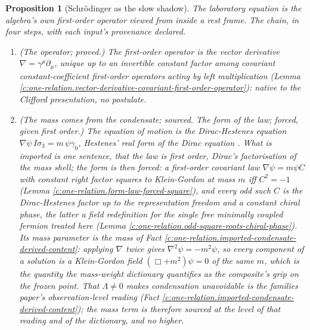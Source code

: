 \documentclass[11pt]{article}
\newtheorem{proposition}[theorem]{Proposition}
\theoremstyle{definition}
\theoremstyle{plain}
\begin{document}
\begin{proposition}[Schrödinger as the slow shadow]\label{c:one-relation.schr-odinger-slow-shadow}
The laboratory equation is the algebra's own first-order operator viewed from inside a rest frame. The chain, in four steps, with each input's provenance declared.
\begin{enumerate}
\item \emph{(The operator; proved.)} The first-order operator is the vector derivative $\nabla = \gamma^{\mu}\partial_{\mu}$, unique up to an invertible constant factor among covariant constant-coefficient first-order operators acting by left multiplication (Lemma \ref{c:one-relation.vector-derivative-covariant-first-order-operator}): native to the Clifford presentation, no postulate.
\item \emph{(The mass comes from the condensate; sourced. The form of the law; forced, given first order.)} The equation of motion is the Dirac-Hestenes equation $\nabla\psi\, I\sigma_{3} = m\,\psi\gamma_{0}$, Hestenes' real form of the Dirac equation \cite{Hestenes1967, Hestenes1975}. What is imported is one sentence, that the law is first order, Dirac's factorisation of the mass shell; the form is then forced: a first-order covariant law $\nabla\psi = m\psi C$ with constant right factor squares to Klein-Gordon at mass $m$ iff $C^{2} = -1$ (Lemma \ref{c:one-relation.form-law-forced-square}), and every odd such $C$ is the Dirac-Hestenes factor up to the representation freedom and a constant chiral phase, the latter a field redefinition for the single free minimally coupled fermion treated here (Lemma \ref{c:one-relation.odd-square-roots-chiral-phase}). Its mass parameter is the mass of Fact \ref{c:one-relation.imported-condensate-derived-content}: applying $\nabla$ twice gives $\nabla^{2}\psi = -m^{2}\psi$, so every component of a solution is a Klein-Gordon field $(\Box + m^{2})\psi = 0$ of the same $m$, which is the quantity the mass-weight dictionary quantifies as the composite's grip on the frozen point. That $\Lambda \neq 0$ makes condensation unavoidable is the families paper's observation-level reading (Fact \ref{c:one-relation.imported-condensate-derived-content}); the mass term is therefore sourced at the level of that reading and of the dictionary, and no higher.

\end{enumerate}
\end{proposition}
\end{document}
